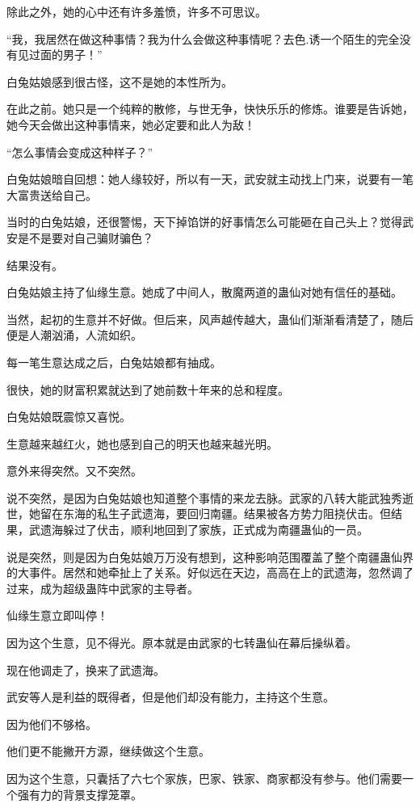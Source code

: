 \begin{this_body}
除此之外，她的心中还有许多羞愤，许多不可思议。

“我，我居然在做这种事情？我为什么会做这种事情呢？去色.诱一个陌生的完全没有见过面的男子！”

白兔姑娘感到很古怪，这不是她的本性所为。

在此之前。她只是一个纯粹的散修，与世无争，快快乐乐的修炼。谁要是告诉她，她今天会做出这种事情来，她必定要和此人为敌！

“怎么事情会变成这种样子？”

白兔姑娘暗自回想：她人缘较好，所以有一天，武安就主动找上门来，说要有一笔大富贵送给自己。

当时的白兔姑娘，还很警惕，天下掉馅饼的好事情怎么可能砸在自己头上？觉得武安是不是要对自己骗财骗色？

结果没有。

白兔姑娘主持了仙缘生意。她成了中间人，散魔两道的蛊仙对她有信任的基础。

当然，起初的生意并不好做。但后来，风声越传越大，蛊仙们渐渐看清楚了，随后便是人潮汹涌，人流如织。

每一笔生意达成之后，白兔姑娘都有抽成。

很快，她的财富积累就达到了她前数十年来的总和程度。

白兔姑娘既震惊又喜悦。

生意越来越红火，她也感到自己的明天也越来越光明。

意外来得突然。又不突然。

说不突然，是因为白兔姑娘也知道整个事情的来龙去脉。武家的八转大能武独秀逝世，她留在东海的私生子武遗海，要回归南疆。结果被各方势力阻挠伏击。但结果，武遗海躲过了伏击，顺利地回到了家族，正式成为南疆蛊仙的一员。

说是突然，则是因为白兔姑娘万万没有想到，这种影响范围覆盖了整个南疆蛊仙界的大事件。居然和她牵扯上了关系。好似远在天边，高高在上的武遗海，忽然调了过来，成为超级蛊阵中武家的主导者。

仙缘生意立即叫停！

因为这个生意，见不得光。原本就是由武家的七转蛊仙在幕后操纵着。

现在他调走了，换来了武遗海。

武安等人是利益的既得者，但是他们却没有能力，主持这个生意。

因为他们不够格。

他们更不能撇开方源，继续做这个生意。

因为这个生意，只囊括了六七个家族，巴家、铁家、商家都没有参与。他们需要一个强有力的背景支撑笼罩。


\end{this_body}
